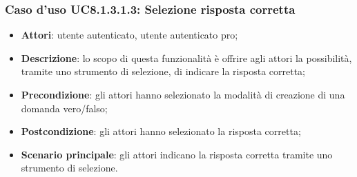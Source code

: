 \subsubsection{Caso d'uso UC8.1.3.1.3: Selezione risposta corretta}
	\begin{itemize}
		\item
			\textbf{Attori}: utente autenticato, utente autenticato pro;
		\item		
			\textbf{Descrizione}: lo scopo di questa funzionalità è offrire agli attori la possibilità, tramite uno strumento di selezione, di indicare la risposta corretta;
		\item
			\textbf{Precondizione}: gli attori hanno selezionato la modalità di creazione di una domanda vero/falso; 
		\item
			\textbf{Postcondizione}: gli attori hanno selezionato la risposta corretta;
		\item
			\textbf{Scenario principale}: gli attori indicano la risposta corretta tramite uno strumento di selezione. 
	 			
	\end{itemize}
	

	
